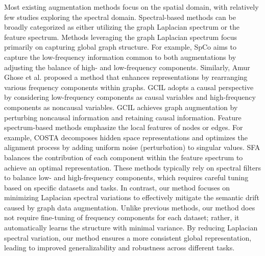 Most existing augmentation methods focus on the spatial domain, with relatively few studies exploring the spectral domain. Spectral-based methods can be broadly categorized as either utilizing the graph Laplacian spectrum or the feature spectrum. Methods leveraging the graph Laplacian spectrum focus primarily on capturing global graph structure. For example, SpCo \cite{liu2022revisiting} aims to capture the low-frequency information common to both augmentations by adjusting the balance of high- and low-frequency components. Similarly, Amur Ghose et al. \cite{ghose2023spectral} proposed a method that enhances representations by rearranging various frequency components within graphs. GCIL \cite{mo2024graph} adopts a causal perspective by considering low-frequency components as causal variables and high-frequency components as noncausal variables. GCIL achieves graph augmentation by perturbing noncausal information and retaining causal information.
Feature spectrum-based methods emphasize the local features of nodes or edges. For example, COSTA \cite{zhang2022costa} decomposes hidden space representations and optimizes the alignment process by adding uniform noise (perturbation) to singular values. SFA \cite{zhang2023spectral} balances the contribution of each component within the feature spectrum to achieve an optimal representation. These methods typically rely on spectral filters to balance low- and high-frequency components, which requires careful tuning based on specific datasets and tasks.
In contrast, our method focuses on minimizing Laplacian spectral variations to effectively mitigate the semantic drift caused by graph data augmentation. Unlike previous methods, our method does not require fine-tuning of frequency components for each dataset; rather, it automatically learns the structure with minimal variance. By reducing Laplacian spectral variation, our method ensures a more consistent global representation, leading to improved generalizability and robustness across different tasks.